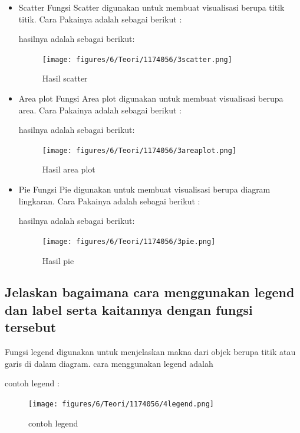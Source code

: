 \begin{itemize}
    \item Scatter\linebreak
    Fungsi Scatter digunakan untuk membuat visualisasi berupa titik titik.
    Cara Pakainya adalah sebagai berikut :
    
    hasilnya adalah sebagai berikut:
    \begin{figure}[H]
        \texttt{[image: figures/6/Teori/1174056/3scatter.png]}
        \caption{Hasil scatter}
        \centering
    \end{figure}

    \item Area plot\linebreak
    Fungsi Area plot digunakan untuk membuat visualisasi berupa area.
    Cara Pakainya adalah sebagai berikut :
    
    hasilnya adalah sebagai berikut:
    \begin{figure}[H]
        \texttt{[image: figures/6/Teori/1174056/3areaplot.png]}
        \caption{Hasil area plot}
        \centering
    \end{figure}

    \item Pie\linebreak
    Fungsi Pie digunakan untuk membuat visualisasi berupa diagram lingkaran.
    Cara Pakainya adalah sebagai berikut :
    
    hasilnya adalah sebagai berikut:
    \begin{figure}[H]
        \texttt{[image: figures/6/Teori/1174056/3pie.png]}
        \caption{Hasil pie}
        \centering
    \end{figure}
    
\end{itemize}

\subsection{Jelaskan bagaimana cara menggunakan legend dan label serta kaitannya dengan fungsi tersebut}
Fungsi legend digunakan untuk menjelaskan makna dari objek berupa titik atau garis di dalam diagram.
cara menggunakan legend adalah 

contoh legend :
\begin{figure}[H]
    \texttt{[image: figures/6/Teori/1174056/4legend.png]}
    \caption{contoh legend}
    \centering
\end{figure}

